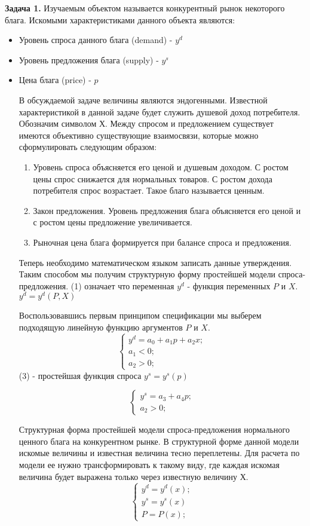 \documentclass[12pt,a4paper]{article}
\begin{document}
\textbf{Задача 1.}
Изучаемым объектом называется конкурентный рынок некоторого блага. Искомыми характеристиками данного объекта являются:
\begin{itemize}
	\item Уровень спроса данного блага (demand) - $y^d$
	\item Уровень предложения блага (supply) - $y^s$
	\item Цена блага (price) - $p$


В обсуждаемой задаче величины являются эндогенными. Известной характеристикой в данной задаче будет служить душевой доход потребителя. Обозначим символом $Х$.
Между спросом и предложением существует имеются объективно существующие взаимосвязи, которые можно сформулировать следующим образом:
\begin{enumerate}
  \item Уровень спроса объясняется его ценой и душевым доходом. С ростом цены спрос снижается для нормальных товаров. С ростом дохода потребителя спрос возрастает. Такое благо называется ценным.
  \item Закон предложения. Уровень предложения блага объясняется его ценой и с ростом цены предложение увеличивается.
  \item Рыночная цена блага формируется при балансе спроса и предложения.
\end{enumerate}

Теперь необходимо математическом языком записать данные утверждения. Таким способом мы получим структурную форму простейшей модели спроса-предложения.
(1) означает что переменная $y^d$ - функция переменных $P$ и $X$.
$y^d=y^d (P, X)$

Воспользовавшись первым принципом спецификации мы выберем подходящую линейную функцию аргументов $P$ и $X$.
\begin{equation}
\begin{cases}
y^d= a_0+a_1p+a_2x; \\
a_1 < 0; \\
a_2 > 0;
\end{cases}
\end{equation}
(3) - простейшая функция спроса
$y^s=y^s(p)$

\begin{equation}
\begin{cases}
y^s=a_3+a_4p; \\
a_2 > 0; %
\end{cases}
\end{equation}

Структурная форма простейшей модели спроса-предложения нормального ценного блага на конкурентном рынке.
В структурной форме данной модели искомые величины и известная величина тесно переплетены. Для расчета по модели ее нужно трансформировать к такому виду, где каждая искомая величина будет выражена только через известную величину $Х$.
\begin{equation}
\begin{cases}
y^d=y^d(x); \\
y^s=y^s(x) \\
P=P(x);
\end{cases}
\end{equation}


\end{itemize}
\end{document}
